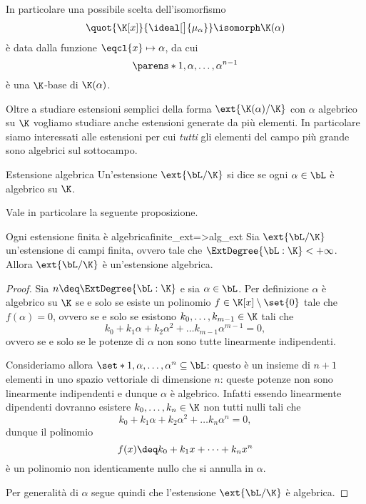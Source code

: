 \begin{remark}
    In particolare una possibile scelta dell'isomorfismo \[
        \quot{\K[x]}{\ideal[\big]{\mu_\alpha}} \isomorph \K(\alpha)
    \] è data dalla funzione $\eqcl{x} \mapsto \alpha$, da cui \[
        \parens*{1, \alpha, \dots, \alpha^{n-1}}
    \] è una $\K$-base di $\K(\alpha)$.  
\end{remark}


Oltre a studiare estensioni semplici della forma $\ext{\K(\alpha) / \K}$ con $\alpha$ algebrico su $\K$ vogliamo studiare anche estensioni generate da più elementi. In particolare siamo interessati alle estensioni per cui \emph{tutti} gli elementi del campo più grande sono algebrici sul sottocampo.

\begin{definition}
    {Estensione algebrica}{}
    Un'estensione $\ext{\bL / \K}$ si dice  se ogni $\alpha \in \bL$ è algebrico su $\K$.  
\end{definition}

Vale in particolare la seguente proposizione.
\begin{proposition}
    {Ogni estensione finita è algebrica}{finite_ext=>alg_ext}
    Sia $\ext{\bL / \K}$ un'estensione di campi finita, ovvero tale che $\ExtDegree{\bL : \K} < +\infty$. Allora $\ext{\bL / \K}$ è un'estensione algebrica.   
\end{proposition}
\begin{proof}
    Sia $n \deq \ExtDegree{\bL : \K}$ e sia $\alpha \in \bL$. Per definizione $\alpha$ è algebrico su $\K$ se e solo se esiste un polinomio $f \in \K[x] \setminus \set{0}$ tale che $f(\alpha) = 0$, ovvero se e solo se esistono $k_0, \dots, k_{m - 1} \in \K$ tali che \[
        k_0 + k_1\alpha + k_2\alpha^2 + \dots k_{m-1}\alpha^{m-1} = 0,
    \] ovvero se e solo se le potenze di $\alpha$ non sono tutte linearmente indipendenti.

    Consideriamo allora $\set*{1, \alpha, \dots, \alpha^n} \subseteq \bL$: questo è un insieme di $n+1$ elementi in uno spazio vettoriale di dimensione $n$: queste potenze non sono linearmente indipendenti e dunque $\alpha$ è algebrico. Infatti essendo linearmente dipendenti dovranno esistere $k_0, \dots, k_n \in \K$ non tutti nulli tali che \[
        k_0 + k_1\alpha + k_2\alpha^2 + \dots k_{n}\alpha^{n} = 0,
    \] dunque il polinomio \[
        f(x) \deq k_0 + k_1x + \dots + k_nx^n
    \] è un polinomio non identicamente nullo che si annulla in $\alpha$.

    Per generalità di $\alpha$ segue quindi che l'estensione $\ext{\bL / \K}$ è algebrica. 
\end{proof}

